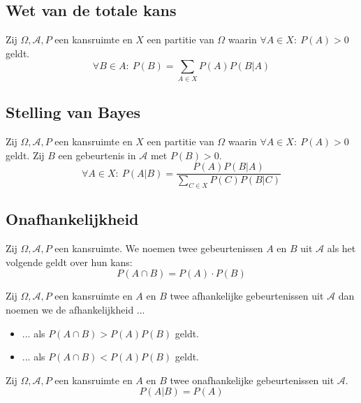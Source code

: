\documentclass[main.tex]{subfiles}
\begin{document}
\subsection{Wet van de totale kans}
\label{sec:wet-van-de}

\begin{st}
  Zij $\Omega,\mathcal{A},P$ een kansruimte en $X$ een partitie van $\Omega$ waarin $\forall A \in X:\ P(A) > 0$ geldt.
  \[ \forall B \in A:\ P(B) = \sum_{A\in X}P(A)P(B|A) \]
\end{st}

\subsection{Stelling van Bayes}
\label{sec:stelling-van-bayes}

\begin{ei}
  Zij $\Omega,\mathcal{A},P$ een kansruimte en $X$ een partitie van $\Omega$ waarin $\forall A \in X:\ P(A) > 0$ geldt.
  Zij $B$ een gebeurtenis in $\mathcal{A}$ met $P(B) > 0$.
  \[ \forall A\in X:\ P(A|B) = \frac{P(A)P(B|A)}{\sum_{C\in X}P(C)P(B|C)} \]
\end{ei}

\subsection{Onafhankelijkheid}
\label{sec:onafhankelijkheid}
\begin{de}
  Zij $\Omega,\mathcal{A},P$ een kansruimte.
  We noemen twee gebeurtenissen $A$ en $B$ uit $\mathcal{A}$  als het volgende geldt over hun kans:
  \[ P(A\cap B) = P(A) \cdot P(B) \]
\end{de}

\begin{de}
  Zij $\Omega,\mathcal{A},P$ een kansruimte en $A$ en $B$ twee afhankelijke gebeurtenissen uit $\mathcal{A}$ dan noemen we de afhankelijkheid ...
  \begin{itemize}
  \item ...  als $P(A \cap B) > P(A)P(B)$ geldt.
  \item ...  als $P(A \cap B) < P(A)P(B)$ geldt.
  \end{itemize}
\end{de}

\begin{st}
  Zij $\Omega,\mathcal{A},P$ een kansruimte en $A$ en $B$ twee onafhankelijke gebeurtenissen uit $\mathcal{A}$.
  \[ P(A|B) = P(A) \]
  
\end{st}
\end{document}
